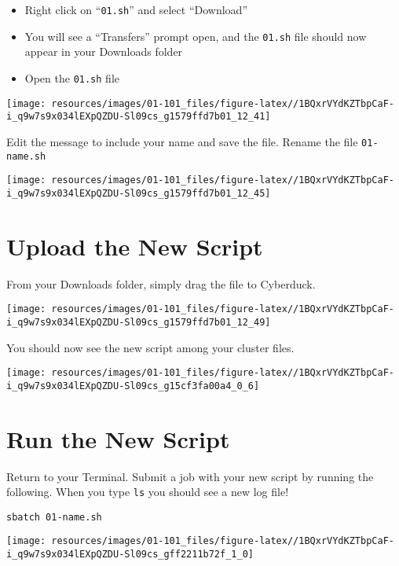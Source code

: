 \documentclass[
]{book}
\providecommand{\tightlist}{%
  \setlength{\itemsep}{0pt}\setlength{\parskip}{0pt}}
\begin{document}
\begin{itemize}
\tightlist
\item
  Right click on ``\texttt{01.sh}'' and select ``Download''
\item
  You will see a ``Transfers'' prompt open, and the \texttt{01.sh} file should now appear in your Downloads folder
\item
  Open the \texttt{01.sh} file
\end{itemize}

\texttt{[image: resources/images/01-101\_files/figure-latex//1BQxrVYdKZTbpCaF-i\_q9w7s9x034lEXpQZDU-Sl09cs\_g1579ffd7b01\_12\_41]}

Edit the message to include your name and save the file. Rename the file \texttt{01-name.sh}

\texttt{[image: resources/images/01-101\_files/figure-latex//1BQxrVYdKZTbpCaF-i\_q9w7s9x034lEXpQZDU-Sl09cs\_g1579ffd7b01\_12\_45]}

\hypertarget{upload-the-new-script}{%
\section{Upload the New Script}\label{upload-the-new-script}}

From your Downloads folder, simply drag the file to Cyberduck.

\texttt{[image: resources/images/01-101\_files/figure-latex//1BQxrVYdKZTbpCaF-i\_q9w7s9x034lEXpQZDU-Sl09cs\_g1579ffd7b01\_12\_49]}

You should now see the new script among your cluster files.

\texttt{[image: resources/images/01-101\_files/figure-latex//1BQxrVYdKZTbpCaF-i\_q9w7s9x034lEXpQZDU-Sl09cs\_g15cf3fa00a4\_0\_6]}

\hypertarget{run-the-new-script}{%
\section{Run the New Script}\label{run-the-new-script}}

Return to your Terminal. Submit a job with your new script by running the following. When you type \texttt{ls} you should see a new log file!

\begin{verbatim}
sbatch 01-name.sh
\end{verbatim}

\texttt{[image: resources/images/01-101\_files/figure-latex//1BQxrVYdKZTbpCaF-i\_q9w7s9x034lEXpQZDU-Sl09cs\_gff2211b72f\_1\_0]}
\end{document}
